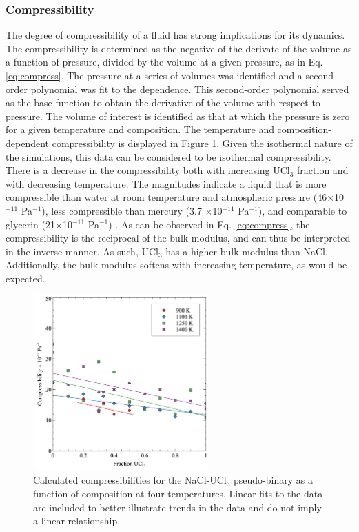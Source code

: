\documentclass[preprint,3p,10pt,onecolumn,number,sort&compress]{elsarticle}
\begin{document}
{\FloatBarrier

\subsubsection{Compressibility}

The degree of compressibility of a fluid has strong implications for its dynamics. The compressibility is determined as the negative of the derivate of the volume as a function of pressure, divided by the volume at a given pressure, as in Eq. \ref{eq:compress}. The pressure at a series of volumes was identified and a second-order polynomial was fit to the dependence. This second-order polynomial served as the base function to obtain the derivative of the volume with respect to pressure. The volume of interest is identified as that at which the pressure is zero for a given temperature and composition. The temperature and composition-dependent compressibility is displayed in Figure \ref{fig:compress}. Given the isothermal nature of the simulations, this data can be considered to be isothermal compressibility. There is a decrease in the compressibility both with increasing UCl$_3$ fraction and with decreasing temperature. The magnitudes indicate a liquid that is more compressible than water at room temperature and atmospheric pressure (46$\times$10$^{-11}$ Pa$^{-1}$), less compressible than mercury (3.7 $\times$10$^{-11}$ Pa$^{-1}$), and comparable to glycerin (21$\times$10$^{-11}$ Pa$^{-1}$) \cite{aiphandbook}. As can be observed in Eq. \ref{eq:compress}, the compressibility is the reciprocal of the bulk modulus, and can thus be interpreted in the inverse manner. As such, UCl$_3$ has a higher bulk modulus than NaCl. Additionally, the bulk modulus softens with increasing temperature, as would be expected. 

\begin{figure}[htb]
\centering
\includegraphics[width=0.6\textwidth]{fig10.jpg}
\caption{Calculated compressibilities for the NaCl-UCl{$_3$} pseudo-binary as a function of composition at four temperatures. Linear fits to the data are included to better illustrate trends in the data and do not imply a linear relationship.} 
\label{fig:compress}
\end{figure}

}
\end{document}
